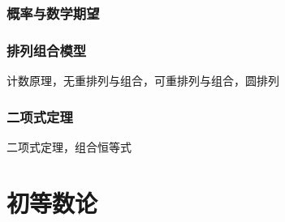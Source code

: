 \documentclass[lang=cn, zihao=5]{elegantbook}
\begin{document}
\section{概率与数学期望}

\section{排列组合模型}

计数原理，无重排列与组合，可重排列与组合，圆排列

\section{二项式定理}

二项式定理，组合恒等式

\part{初等数论}
\end{document}
